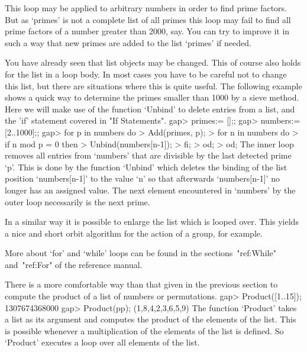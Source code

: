 This loop  may  be applied  to arbitrary  numbers in order  to find prime
factors.  But  as `primes' is not a complete list of all primes this loop
may fail  to find all prime factors of  a number greater than 2000,  say.
You  can try to improve it in such a way that new primes are added to the
list `primes' if needed.

You have already seen that list objects may be  changed.   This of
course also holds  for the  list in a loop body.  In most  cases  you have to be
careful not  to change this list, but there are situations  where this is
quite useful.  The following example  shows a quick way  to determine the
primes smaller than 1000 by a sieve method.  Here we will make use of the
function `Unbind' to delete entries from a list, and the 'if'
statement covered in "If Statements".
\beginexample
gap> primes:= [];;
gap> numbers:= [2..1000];;
gap> for p in numbers do
>       Add(primes, p);
>       for n in numbers do
>          if n mod p = 0 then
>             Unbind(numbers[n-1]);
>          fi;
>       od;
>    od;
\endexample
The inner loop  removes all entries from `numbers' that are  divisible by
the last detected prime `p'.  This is done by the function `Unbind' which
deletes the binding of the list position  `numbers[n-1]' to the value `n'
so that afterwards `numbers[n-1]' no longer has  an  assigned value.  The
next  element encountered in `numbers'  by the outer  loop necessarily is
the next prime.

In a similar way it is possible to enlarge the list which is looped over.
This yields a nice and short orbit  algorithm for the  action of a group,
for example.

More about `for' and `while' loops can be found in the
sections~"ref:While" and~"ref:For" of the reference manual.


There is a more comfortable way than that given in the previous section to
compute the product of a list of numbers or permutations.
\beginexample
gap> Product([1..15]);
1307674368000
gap> Product(pp);
(1,8,4,2,3,6,5,9)
\endexample
The function  `Product'  takes a  list as  its argument and computes  the
product  of  the  elements  of the  list.   This  is possible whenever  a
multiplication of  the elements of the list is defined.  So  `Product' 
executes a loop over all elements of the list.

